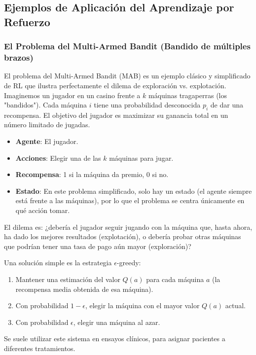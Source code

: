 \documentclass[12pt,a4paper]{book}
\begin{document}
\subsection{Ejemplos de Aplicación del Aprendizaje por Refuerzo}

\subsubsection{El Problema del Multi-Armed Bandit (Bandido de múltiples brazos)}

El problema del Multi-Armed Bandit (MAB) es un ejemplo clásico y simplificado de RL que ilustra perfectamente el dilema de exploración vs. explotación. Imaginemos un jugador en un casino frente a $k$ máquinas tragaperras (los "bandidos"). Cada máquina $i$ tiene una probabilidad desconocida $p_i$ de dar una recompensa. El objetivo del jugador es maximizar su ganancia total en un número limitado de jugadas.

\begin{itemize}
    \item \textbf{Agente}: El jugador.
    \item \textbf{Acciones}: Elegir una de las $k$ máquinas para jugar.
    \item \textbf{Recompensa}: 1 si la máquina da premio, 0 si no.
    \item \textbf{Estado}: En este problema simplificado, solo hay un estado (el agente siempre está frente a las máquinas), por lo que el problema se centra únicamente en qué acción tomar.
\end{itemize}

El dilema es: ¿debería el jugador seguir jugando con la máquina que, hasta ahora, ha dado los mejores resultados (explotación), o debería probar otras máquinas que podrían tener una tasa de pago aún mayor (exploración)?

Una solución simple es la estrategia $\epsilon$-greedy:
\begin{enumerate}
    \item Mantener una estimación del valor $Q(a)$ para cada máquina $a$ (la recompensa media obtenida de esa máquina).
    \item Con probabilidad $1-\epsilon$, elegir la máquina con el mayor valor $Q(a)$ actual.
    \item Con probabilidad $\epsilon$, elegir una máquina al azar.
\end{enumerate}

Se suele utilizar este sistema en ensayos clínicos, para asignar pacientes a diferentes tratamientos.
\end{document}
